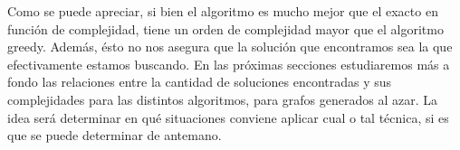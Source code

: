 Como se puede apreciar, si bien el algoritmo es mucho mejor que el exacto en función de complejidad, tiene un orden de complejidad mayor que el algoritmo greedy. Además, ésto no nos asegura que la solución que encontramos sea la que efectivamente estamos buscando. En las próximas secciones estudiaremos más a fondo las relaciones entre la cantidad de soluciones encontradas y sus complejidades para las distintos algoritmos, para grafos generados al azar. La idea será determinar en qué situaciones conviene aplicar cual o tal técnica, si es que se puede determinar de antemano.
